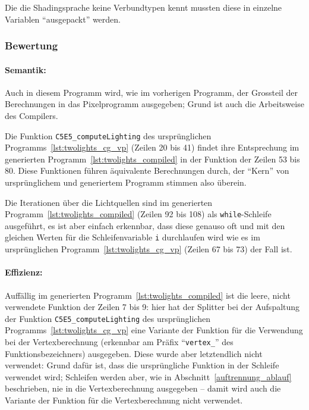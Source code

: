 \documentclass[twoside,a4paper,fleqn,12pt]{book}
\begin{document}
{}

Die die Shadingsprache keine Verbundtypen kennt mussten diese in einzelne Variablen "`ausgepackt"' werden.

{}

\subsubsection{Bewertung}
\paragraph{Semantik:}
Auch in diesem Programm wird, wie im vorherigen Programm, der Grossteil der Berechnungen in das Pixelprogramm ausgegeben;
Grund ist auch die Arbeitsweise des Compilers.

Die Funktion \verb+C5E5_computeLighting+ des ursprünglichen Programms~\ref{lst:twolights_cg_vp} (Zeilen 20 bis 41)
findet ihre Entsprechung im generierten Programm~\ref{lst:twolights_compiled} in der Funktion der Zeilen 53 bis 80.
Diese Funktionen führen äquivalente Berechnungen durch, der "`Kern"' von ursprünglichem und generiertem Programm
stimmen also überein. 

Die Iterationen über die Lichtquellen sind im generierten Programm~\ref{lst:twolights_compiled} (Zeilen 92 bis 108)
als \verb+while+-Schleife ausgeführt, es ist aber einfach erkennbar, dass diese genauso oft und mit den gleichen
Werten für die Schleifenvariable \verb+i+ durchlaufen wird wie es im ursprünglichen Programm~\ref{lst:twolights_cg_vp} (Zeilen 67 bis 73)
der Fall ist.

\paragraph{Effizienz:}
Auffällig im generierten Programm~\ref{lst:twolights_compiled} ist die leere, nicht verwendete Funktion der Zeilen 7 bis 9:
hier hat der Splitter bei der Aufspaltung der Funktion \verb+C5E5_computeLighting+ des ursprünglichen Programms~\ref{lst:twolights_cg_vp}
eine Variante der Funktion für die Verwendung bei der Vertexberechnung (erkennbar am Präfix "`\verb+vertex_+"' des Funktionsbezeichners) ausgegeben.
Diese wurde aber letztendlich nicht verwendet: Grund dafür ist, dass die ursprüngliche Funktion in der Schleife verwendet wird;
Schleifen werden aber, wie in Abschnitt~\ref{auftrennung_ablauf} beschrieben, nie in die Vertexberechnung ausgegeben --
damit wird auch die Variante der Funktion für die Vertexberechnung nicht verwendet.
\end{document}
